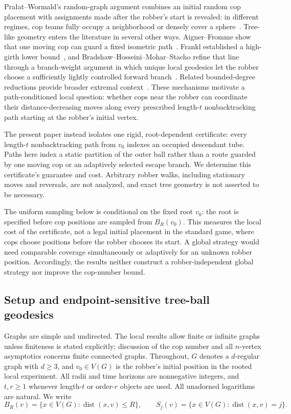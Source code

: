 \documentclass[11pt]{amsart}
\theoremstyle{definition}
\DeclareMathOperator{\dist}{dist}
\begin{document}
Pra\l at--Wormald's random-graph argument combines an initial random cop placement with assignments made after the robber's start is revealed: in different regimes, cop teams fully occupy a neighborhood or densely cover a sphere~\cite{PralatWormald}. Tree-like geometry enters the literature in several other ways. Aigner--Fromme show that one moving cop can guard a fixed isometric path~\cite{AignerFromme}. Frankl established a high-girth lower bound~\cite{Frankl}, and Bradshaw--Hosseini--Mohar--Stacho refine that line through a branch-weight argument in which unique local geodesics let the robber choose a sufficiently lightly controlled forward branch~\cite{BradshawHosseiniMoharStacho}. Related bounded-degree reductions provide broader extremal context~\cite{HMG}. These mechanisms motivate a path-conditioned local question: whether cops near the robber can coordinate their distance-decreasing moves along every prescribed length-$t$ nonbacktracking path starting at the robber's initial vertex.

The present paper instead isolates one rigid, root-dependent certificate: every length-$t$ nonbacktracking path from $v_0$ indexes an occupied descendant tube. Paths here index a static partition of the outer ball rather than a route guarded by one moving cop or an adaptively selected escape branch. We determine this certificate's guarantee and cost. Arbitrary robber walks, including stationary moves and reversals, are not analyzed, and exact tree geometry is not asserted to be necessary.

The uniform sampling below is conditional on the fixed root $v_0$: the root is specified before cop positions are sampled from $B_R(v_0)$. This measures the local cost of the certificate, not a legal initial placement in the standard game, where cops choose positions before the robber chooses its start. A global strategy would need comparable coverage simultaneously or adaptively for an unknown robber position. Accordingly, the results neither construct a robber-independent global strategy nor improve the cop-number bound.

\subsection{Setup and endpoint-sensitive tree-ball geodesics}

Graphs are simple and undirected. The local results allow finite or infinite graphs unless finiteness is stated explicitly; discussion of the cop number and all $n$-vertex asymptotics concerns finite connected graphs. Throughout, $G$ denotes a $d$-regular graph with $d\geq3$, and $v_0\in V(G)$ is the robber's initial position in the rooted local experiment. All radii and time horizons are nonnegative integers, and $t,r\geq1$ whenever length-$t$ or order-$r$ objects are used. All unadorned logarithms are natural. We write
\[
B_R(v)=\{x\in V(G):\dist(x,v)\leq R\},
\qquad
S_j(v)=\{x\in V(G):\dist(x,v)=j\}.
\]
\end{document}
